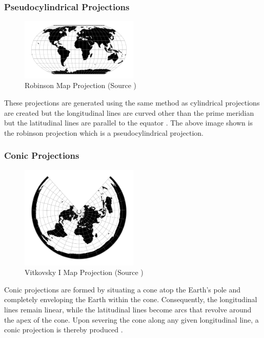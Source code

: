 \subsubsection{Pseudocylindrical Projections}

\begin{figure}[H]
    \centering
    \includegraphics[width=0.5\textwidth]{figures/chapter-1/robinson.png}
    \caption{Robinson Map Projection (Source \cite{PROJ_SITE})}
    \label{fig:robinson-image}
\end{figure}


These projections are generated using the same method as cylindrical projections are created but the longitudinal lines are curved other than the prime meridian but the latitudinal lines are parallel to the equator \cite{GISGEO_Cylinder}.
The above image shown is the robinson projection which is a pseudocylindrical projection.

\subsubsection{Conic Projections}

\begin{figure}[H]
    \centering
    \includegraphics[width=0.5\textwidth]{figures/chapter-3/vitk1.png}
    \caption{Vitkovsky I Map Projection (Source \cite{PROJ_SITE})}
    \label{fig:vitkovsky-image}
\end{figure}
Conic projections are formed by situating a cone atop the Earth's pole and completely enveloping the Earth within the cone. Consequently, the longitudinal lines remain linear, while the latitudinal lines become arcs that revolve around the apex of the cone. Upon severing the cone along any given longitudinal line, a conic projection is thereby produced \cite{Snyder1982}.

